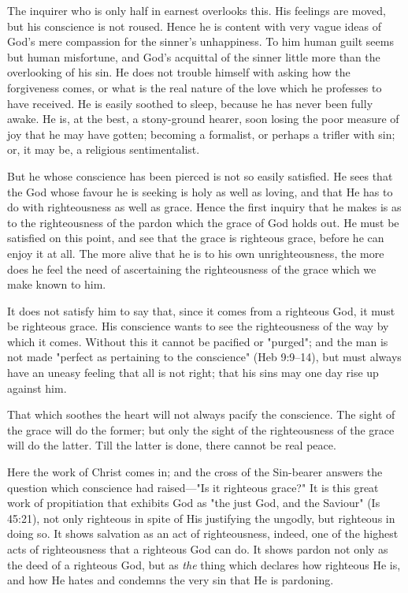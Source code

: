 \documentclass[
]{book}
\begin{document}
The inquirer who is only half in earnest overlooks this. His feelings are moved, but his conscience is not roused. Hence he is content with very vague ideas of God's mere compassion for the sinner's unhappiness. To him human guilt seems but human misfortune, and God's acquittal of the sinner little more than the overlooking of his sin. He does not trouble himself with asking how the forgiveness comes, or what is the real nature of the love which he professes to have received. He is easily soothed to sleep, because he has never been fully awake. He is, at the best, a stony-ground hearer, soon losing the poor measure of joy that he may have gotten; becoming a formalist, or perhaps a trifler with sin; or, it may be, a religious sentimentalist.

But he whose conscience has been pierced is not so easily satisfied. He sees that the God whose favour he is seeking is holy as well as loving, and that He has to do with righteousness as well as grace. Hence the first inquiry that he makes is as to the righteousness of the pardon which the grace of God holds out. He must be satisfied on this point, and see that the grace is righteous grace, before he can enjoy it at all. The more alive that he is to his own unrighteousness, the more does he feel the need of ascertaining the righteousness of the grace which we make known to him.

It does not satisfy him to say that, since it comes from a righteous God, it must be righteous grace. His conscience wants to see the righteousness of the way by which it comes. Without this it cannot be pacified or "purged"; and the man is not made "perfect as pertaining to the conscience" (Heb 9:9--14), but must always have an uneasy feeling that all is not right; that his sins may one day rise up against him.

That which soothes the heart will not always pacify the conscience. The sight of the grace will do the former; but only the sight of the righteousness of the grace will do the latter. Till the latter is done, there cannot be real peace.

Here the work of Christ comes in; and the cross of the Sin-bearer answers the question which conscience had raised---"Is it righteous grace?" It is this great work of propitiation that exhibits God as "the just God, and the Saviour" (Is 45:21), not only righteous in spite of His justifying the ungodly, but righteous in doing so. It shows salvation as an act of righteousness, indeed, one of the highest acts of righteousness that a righteous God can do. It shows pardon not only as the deed of a righteous God, but as \emph{the} thing which declares how righteous He is, and how He hates and condemns the very sin that He is pardoning.
\end{document}
